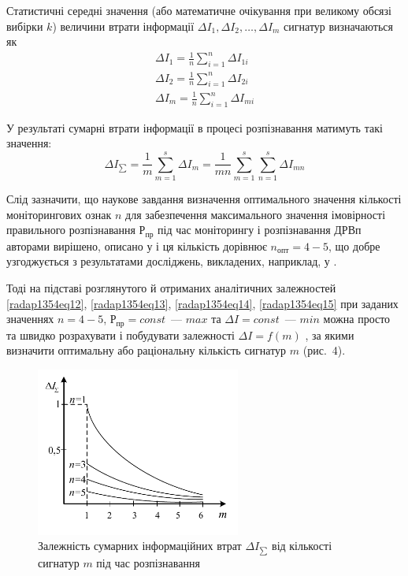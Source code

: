 Статистичні середні значення (або математичне очікування при великому обсязі вибірки $k$) величини втрати інформації $ \Delta I_1, \Delta I_2 , \ldots, \Delta I_m $  сигнатур визначаються як
\begin{equation}\label{radap1354eq14}
\begin{matrix}
\Delta I_{1} = \frac{1}{n} \sum\limits_{i=1}^{n} \Delta I_{1i} \\
\Delta I_{2} = \frac{1}{n} \sum\limits_{i=1}^{n} \Delta I_{2i} \\
\Delta I_{m} = \frac{1}{n} \sum\limits_{i=1}^{n} \Delta I_{mi} 
\end{matrix}
\end{equation}

У результаті сумарні втрати інформації в процесі розпізнавання матимуть такі значення:
\begin{equation}\label{radap1354eq15}
\Delta I_{\sum} = \frac{1}{m}\sum\limits_{m=1}^{s} \Delta I_m  = \frac{1}{mn}\sum\limits_{m=1}^{s} \sum\limits_{n=1}^{s}\Delta I_{mn}   
\end{equation}

Слід зазначити, що наукове завдання визначення оптимального значення кількості моніторингових ознак $n$ для забезпечення максимального значення імовірності правильного розпізнавання $Р_{пр}$ під час моніторингу і розпізнавання ДРВп авторами вирішено, описано у \cite{radap1354ref1} і ця кількість дорівнює $n_{опт} = 4-5$, що добре узгоджується з результатами досліджень, викладених, наприклад, у \cite{radap1354ref4}.

Тоді на підставі розглянутого й отриманих аналітичних залежностей \eqref{radap1354eq12}, \eqref{radap1354eq13}, \eqref{radap1354eq14}, \eqref{radap1354eq15} при заданих значеннях $n = 4-5$, $Р_{пр} = const$~--- $max$ та $\Delta I = const$~--- $min$ можна просто та швидко розрахувати і побудувати залежності $\Delta I = f(m)$ , за якими визначити оптимальну або раціональну кількість сигнатур $m$ (рис.~4).


\begin{figure}[htbp]\center
	\includegraphics[width=0.6\textwidth]{fig4}
	
	\caption{Залежність сумарних інформаційних втрат  $\Delta I_{\sum}$
		від кількості сигнатур $m$ під час розпізнавання}\label{fig4}
\end{figure}



